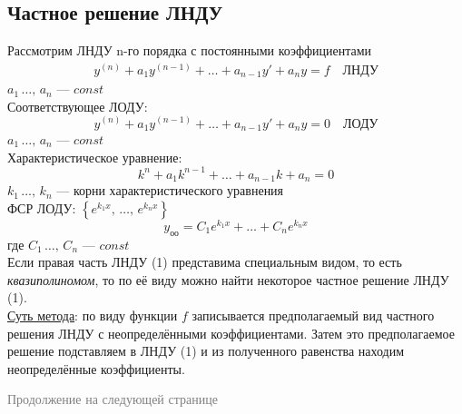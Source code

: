 \subsection*{Частное решение ЛНДУ}
Рассмотрим ЛНДУ n-го порядка с постоянными коэффициентами
\begin{align*}
    y^{(n)} + a_1 y^{(n-1)} + \ldots + a_{n-1} y' + a_n y = f\quad \text{ЛНДУ} \tag{1}
\end{align*}
$a_1\, \ldots,\, a_n$ --- $const$\\[1ex]
Соответствующее ЛОДУ:
\[
    y^{(n)} + a_1 y^{(n-1)} + \ldots + a_{n-1} y' + a_n y = 0\quad \text{ЛОДУ}
\]
$a_1\, \ldots,\, a_n$ --- $const$\\[1ex]
Характеристическое уравнение:
\[
    k^n + a_1k^{n-1} + \ldots + a_{n-1}k + a_n = 0
\]
$k_1\, \ldots,\, k_n$ --- корни характеристического уравнения \\[1ex]
ФСР ЛОДУ: $\left\{ e^{k_1x},\, \ldots,\, e^{k_nx} \right\}$
\[
    y_{\text{оо}} = C_1 e^{k_1x} + \ldots + C_n e^{k_nx}
\]
где $C_1\, \ldots,\, C_n$ --- $const$\\[1ex]
Если правая часть ЛНДУ (1) представима специальным видом, то есть \textit{квазиполиномом}, то по её виду можно найти некоторое частное решение ЛНДУ (1). \\[1ex]
\underline{Суть метода}: по виду функции $f$ записывается предполагаемый вид частного решения ЛНДУ с неопределёнными коэффициентами. Затем это предполагаемое решение подставляем в ЛНДУ (1) и из полученного равенства находим неопределённые коэффициенты. \\[2ex]
\begin{center}
    \textcolor{gray}{Продолжение на следующей странице}
\end{center}
